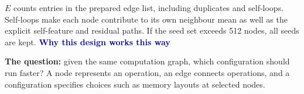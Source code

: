 \documentclass[11pt,a4paper]{article}
\begin{document}
\begin{center}
\end{center}
\small $E$ counts entries in the prepared edge list, including duplicates and self-loops.
Self-loops make each node contribute to its own neighbour mean as well as the explicit
self-feature and residual paths. If the seed set exceeds 512 nodes, all seeds are kept.
\normalsize
\newpage
{\LARGE\bfseries\textcolor{navy}{Why this design works this way}}\par
\textbf{The question:} given the same computation graph, which configuration should
run faster? A node represents an operation, an edge connects operations, and a
configuration specifies choices such as memory layouts at selected nodes.
\end{document}
